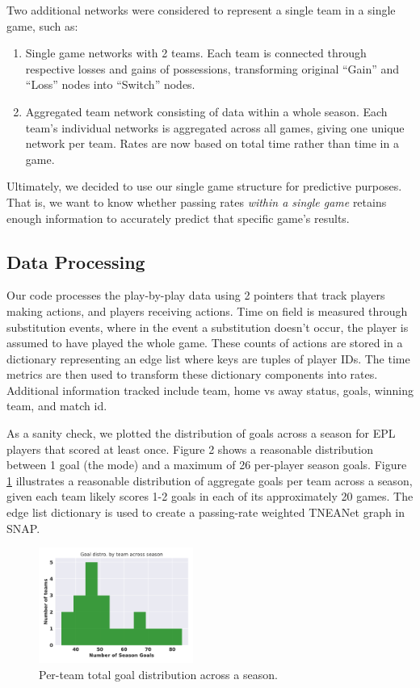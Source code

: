 Two additional networks were considered to represent a single team in a single game, such as:

\begin{enumerate}
    \item Single game networks with 2 teams. Each team is connected through respective losses and gains of possessions, transforming original ``Gain'' and ``Loss'' nodes into ``Switch'' nodes.

    \item Aggregated team network consisting of data within a whole season. Each team's individual networks is aggregated across all games, giving one unique network per team. Rates are now based on total time rather than time in a game. 
\end{enumerate}

Ultimately, we decided to use our single game structure for predictive purposes. That is, we want to know whether passing rates \textit{within a single game} retains enough information to accurately predict that specific  game's results. 

\subsection{Data Processing}

Our code processes the play-by-play data using 2 pointers that track players making actions, and players receiving actions. Time on field is measured through substitution events, where in the event a substitution doesn't occur, the player is assumed to have played the whole game. These counts of actions are stored in a dictionary representing an edge list where keys are tuples of player IDs. The time metrics are then used to transform these dictionary components into rates. Additional information tracked include team, home vs away status, goals, winning team, and match id. 

As a sanity check, we plotted the distribution of goals across a season for EPL players that scored at least once. Figure 2 shows a reasonable distribution between 1 goal (the mode) and a maximum of 26 per-player season goals. Figure \ref{fig:per_team_goal_distro} illustrates a reasonable distribution of aggregate goals
per team across a season, given each team likely scores 1-2 goals in each of its approximately 20 games.
The edge list dictionary is used to create a passing-rate weighted TNEANet graph in SNAP. 

\begin{figure}
  \centering
  \includegraphics[width=0.45\textwidth]{plots/eplper_TEAM_goal_hist.pdf}
  \caption{Per-team total goal distribution across a season.}
    \label{fig:per_team_goal_distro}
\end{figure}


